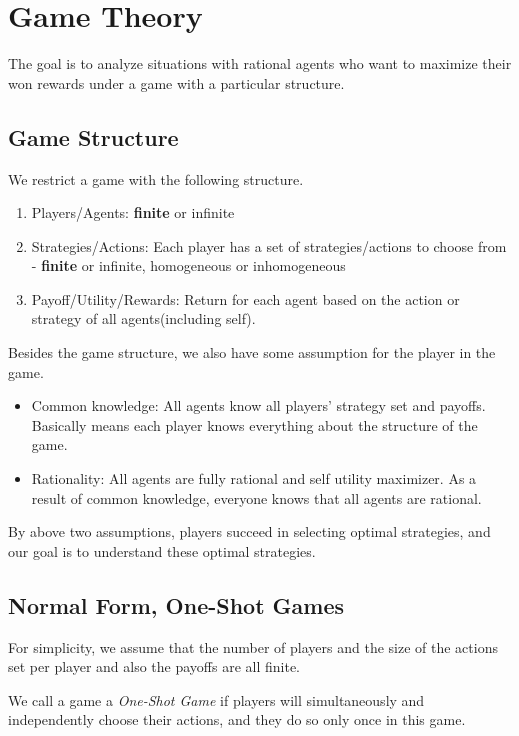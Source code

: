 \section{Game Theory}
The goal is to analyze situations with rational agents who want to maximize their won rewards under a game with a particular structure.

\subsection{Game Structure}
We restrict a game with the following structure.
\begin{enumerate}
	\item Players/Agents: \textbf{finite} or infinite
	\item Strategies/Actions: Each player has a set of strategies/actions to choose from - \textbf{finite} or infinite, homogeneous or inhomogeneous
	\item Payoff/Utility/Rewards: Return for each agent based on the action or strategy of all agents(including self).
\end{enumerate}

Besides the game structure, we also have some assumption for the player in the game.
\begin{itemize}
	\item Common knowledge: All agents know all players' strategy set and payoffs. Basically means each player knows everything about the structure of the game.
	\item Rationality: All agents are fully rational and self utility maximizer. As a result of common knowledge, everyone knows that all
	      agents are rational.
\end{itemize}

\begin{note}
	By above two assumptions, players succeed in selecting optimal strategies, and our goal is to understand these optimal strategies.
\end{note}

\subsection{Normal Form, One-Shot Games}
For simplicity, we assume that the number of players and the size of the actions set per player and also the payoffs are all finite.

\begin{definition}
	We call a game a \emph{One-Shot Game} if players will simultaneously and independently choose their actions, and they do
	so only once in this game.
\end{definition}

